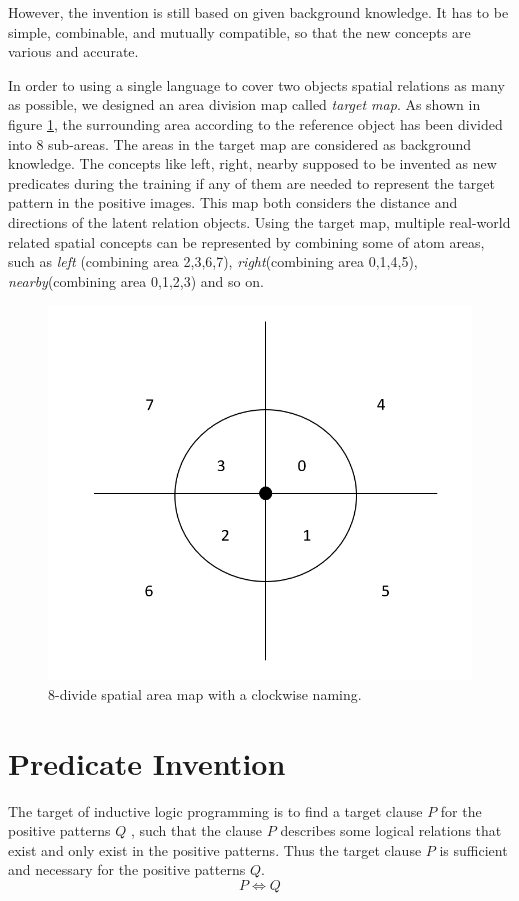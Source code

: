 \documentclass[
]{ceurart}
\begin{document}
However, the invention is still based on given background knowledge. It has to be simple, combinable,  and mutually compatible, so that the new concepts are various and accurate.

In order to using a single language to cover two objects spatial relations as many as possible, we designed an area division map called \textit{target map}. As shown in figure \ref{fig:8-area}, the surrounding area according to the reference object has been divided into 8 sub-areas. 
The areas in the target map are considered as background knowledge. The concepts like left, right, nearby supposed to be invented as new predicates during the training if any of them are needed to represent the target pattern in the positive images.  This map both considers the distance and directions of the latent relation objects. 
Using the target map, multiple real-world related spatial concepts can be represented by combining some of atom areas, such as 
\textit{left} (combining area 2,3,6,7), 
\textit{right}(combining area 0,1,4,5), 
\textit{nearby}(combining area 0,1,2,3) and so on. 

\begin{figure}
	\centering
	\includegraphics[width=0.5\linewidth]{img/area_8.png} 
	\caption{8-divide spatial area map with a clockwise naming.}
	\label{fig:8-area}
\end{figure}

\newpage
\section{Predicate Invention}
The target of inductive logic programming is to find a target clause $ P $ for the positive patterns $ Q $ , such that the clause $ P $ describes some logical relations that exist and only exist in the positive patterns. 
Thus the target clause $ P $ is sufficient and necessary for the positive patterns $ Q $.
\[ P\Leftrightarrow Q \]
\end{document}
